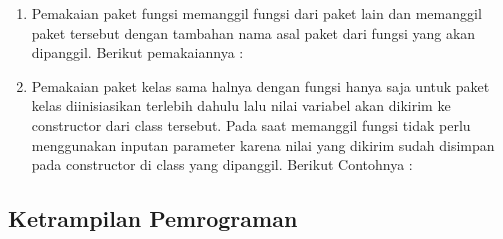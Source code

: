 \begin{enumerate}
	\item Pemakaian paket fungsi memanggil fungsi dari paket lain dan memanggil paket tersebut dengan tambahan nama asal paket dari fungsi yang akan dipanggil. Berikut pemakaiannya : 
	
	\item Pemakaian paket kelas sama halnya dengan fungsi hanya saja untuk paket kelas diinisiasikan terlebih dahulu lalu nilai variabel akan dikirim ke constructor dari class tersebut. Pada saat memanggil fungsi tidak perlu menggunakan inputan parameter karena nilai yang dikirim sudah disimpan pada constructor di class yang dipanggil. Berikut Contohnya : 
	
\end{enumerate}
\subsection{Ketrampilan Pemrograman}
